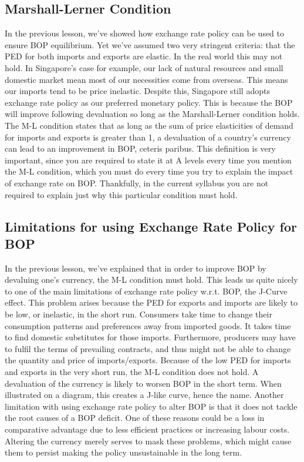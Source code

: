 \documentclass[DIV=classic,11pt,numbers=noenddot,listof=totoc,bibliography=totoc,parskip]{scrartcl}
\begin{document}
\subsection{Marshall-Lerner Condition}
In the previous lesson, we’ve showed how exchange rate policy can be used to ensure BOP equilibrium. Yet we’ve assumed two very stringent criteria: that the PED for both imports and exports are elastic. In the real world this may not hold. In Singapore’s case for example, our lack of natural resources and small domestic market mean most of our necessities come from overseas. This means our imports tend to be price inelastic. Despite this, Singapore still adopts exchange rate policy as our preferred monetary policy. This is because the BOP will improve following devaluation so long as the Marshall-Lerner condition holds. The M-L condition states that as long as the sum of price elasticities of demand for imports and exports is greater than 1, a devaluation of a country’s currency can lead to an improvement in BOP, ceteris paribus. This definition is very important, since you are required to state it at A levels every time you mention the M-L condition, which you must do every time you try to explain the impact of exchange rate on BOP. Thankfully, in the current syllabus you are not required to explain just why this particular condition must hold.
\subsection{Limitations for using Exchange Rate Policy for BOP}
In the previous lesson, we’ve explained that in order to improve BOP by devaluing one’s currency, the M-L condition must hold. This leads us quite nicely to one of the main limitations of exchange rate policy w.r.t. BOP, the J-Curve effect. This problem arises because the PED for exports and imports are likely to be low, or inelastic, in the short run. Consumers take time to change their consumption patterns and preferences away from imported goods. It takes time to find domestic substitutes for those imports. Furthermore, producers may have to fulfil the terms of prevailing contracts, and thus might not be able to change the quantity and price of imports/exports. Because of the low PED for imports and exports in the very short run, the M-L condition does not hold. A devaluation of the currency is likely to worsen BOP in the short term. When illustrated on a diagram, this creates a J-like curve, hence the name. Another limitation with using exchange rate policy to alter BOP is that it does not tackle the root causes of a BOP deficit. One of these reasons could be a loss in comparative advantage due to less efficient practices or increasing labour costs. Altering the currency merely serves to mask these problems, which might cause them to persist making the policy unsustainable in the long term.
\newpage
\end{document}
